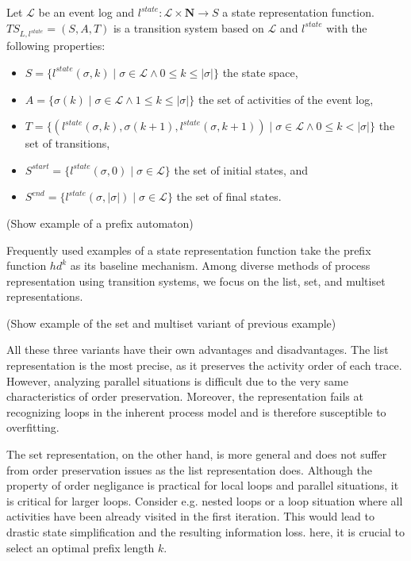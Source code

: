 \begin{definition}\label{def:pa}

    Let $\mathcal{L}$ be an event log and $l^{state}: \mathcal{L} \times \mathbf{N} \rightarrow S$ a state representation function. $TS_{L, l^{state}} = (S, A, T)$ is a transition system based on $\mathcal{L}$ and $l^{state}$ with the following properties:
    
    \begin{itemize}
        \item $S = \{l^{state}(\sigma, k) \mid \sigma \in \mathcal{L} \land 0 \leq k \leq \lvert \sigma \rvert \}$ the state space,
        \item $A = \{ \sigma(k) \mid \sigma \in \mathcal{L} \land 1 \leq k \leq \lvert \sigma \rvert \}$ the set of activities of the event log,
        \item $T = \{ (l^{state}(\sigma, k), \sigma(k+1), l^{state}(\sigma, k+1)) \mid \sigma \in \mathcal{L} \land 0 \leq k < \lvert \sigma \rvert \}$ the set of transitions,
        \item $S^{start} = \{ l^{state}(\sigma, 0) \mid \sigma \in \mathcal{L} \}$ the set of initial states, and
        \item $S^{end} = \{ l^{state}(\sigma, \lvert \sigma \rvert) \mid \sigma \in \mathcal{L} \}$ the set of final states.
    \end{itemize} 

\end{definition}

(Show example of a prefix automaton)

Frequently used examples of a state representation function take the prefix function $hd^k$ as its baseline mechanism. Among diverse methods of process representation using transition systems, we focus on the list, set, and multiset representations.

(Show example of the set and multiset variant of previous example)

All these three variants have their own advantages and disadvantages. The list representation is the most precise, as it preserves the activity order of each trace. However, analyzing parallel situations is difficult due to the very same characteristics of order preservation. Moreover, the representation fails at recognizing loops in the inherent process model and is therefore susceptible to overfitting.

The set representation, on the other hand, is more general and does not suffer from order preservation issues as the list representation does. Although the property of order negligance is practical for local loops and parallel situations, it is critical for larger loops. Consider e.g. nested loops or a loop situation where all activities have been already visited in the first iteration. This would lead to drastic state simplification and the resulting information loss. here, it is crucial to select an optimal prefix length $k$.
 
